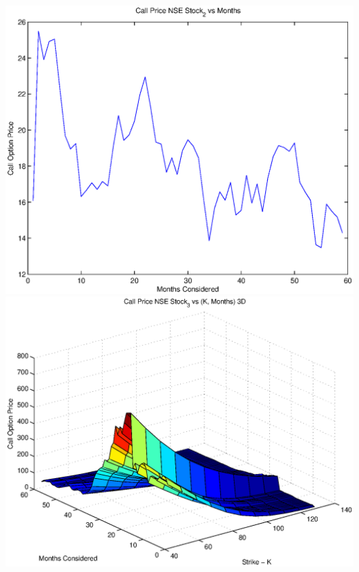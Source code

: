 \documentclass{article}
\begin{document}
\includegraphics[width=\textwidth]{Call_Price_NSE_Stock_2_vs_Months} \\

\includegraphics[width=\textwidth]{Call_Price_NSE_Stock_3_vs_(K,_Months)_3D} \\
\end{document}
